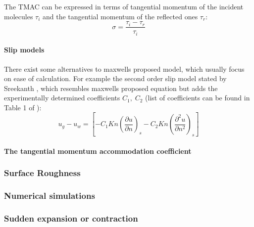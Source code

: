 The TMAC can be expressed in terms of tangential momentum of the incident molecules $\tau_i$ and the tangential momentum of the reflected ones $\tau_r$:
$$
	\sigma = \frac{\tau_i - \tau_r}{\tau_i}
$$

\paragraph*{Slip models}
There exist some alternatives to maxwells proposed model, which usually focus on ease of calculation.
For example the second order slip model stated by Sreekanth \cite{sreekanth1969slip}, which resembles maxwells proposed equation but adds the experimentally determined coefficients $C_1,\; C_2$ (list of coefficients can be found in Table 1 of \cite{agrawal_comprehensive_2011}):
$$
	u_g - u_w =
	\left[
		- C_1Kn\left(\frac{\partial u}{\partial n}\right)_s
		- C_2 Kn \left(\frac{\partial^2 u}{\partial n^2}\right)_s
	\right]
$$
\paragraph*{The tangential momentum accommodation coefficient}
\subsubsection*{Surface Roughness}

\subsubsection*{Numerical simulations}

\subsubsection*{Sudden expansion or contraction}

